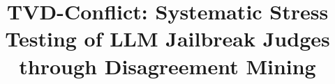 \title{TVD-Conflict: Systematic Stress Testing of LLM Jailbreak Judges through Disagreement Mining}
